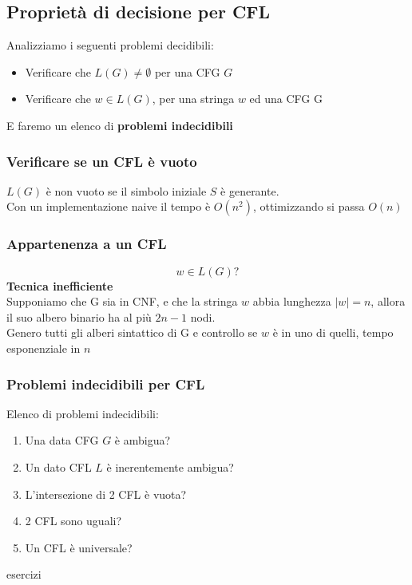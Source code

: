 \documentclass[12pt]{article}
\begin{document}
\subsection{Proprietà di decisione per CFL}
Analizziamo i seguenti problemi decidibili:
\begin{itemize}
  \item Verificare che $L(G) \neq \emptyset$ per una CFG $G$
  \item Verificare che $w \in L(G)$, per una stringa $w$ ed una CFG G
\end{itemize}
E faremo un elenco di \textbf{problemi indecidibili}

\subsubsection{Verificare se un CFL è vuoto}
$L(G)$ è non vuoto se il simbolo iniziale $S$ è generante.
\\ Con un implementazione naive il tempo è $O(n^2)$, ottimizzando si passa $O(n)$

\subsubsection{Appartenenza a un CFL}
\[w \in L(G)?\]
\textbf{Tecnica inefficiente}
\\ Supponiamo che G sia in CNF, e che la stringa $w$ abbia lunghezza $|w|=n$, allora il suo albero binario ha al più $2n-1$ nodi.
\\ Genero tutti gli alberi sintattico di G e controllo se $w$ è in uno di quelli, tempo esponenziale in $n$

\subsubsection{Problemi indecidibili per CFL}
Elenco di problemi indecidibili: 
\begin{enumerate}
  \item Una data CFG $G$ è ambigua?
  \item Un dato CFL $L$ è inerentemente ambigua?
  \item L'intersezione di 2 CFL è vuota?
  \item 2 CFL sono uguali?
  \item Un CFL è universale?
\end{enumerate}

\newpage
{esercizi}
\end{document}
